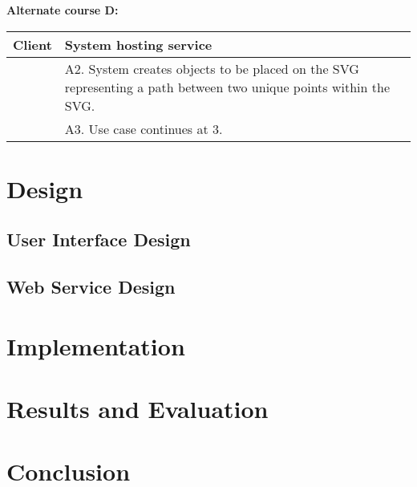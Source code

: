 \documentclass[11pt,twoside,a4paper]{article}
\begin{document}
\noindent
\textbf{Alternate course D:}\\
\begin{tabularx}{\textwidth}{ |X|X| }
  \textbf{Client} & \textbf{System hosting service}\\
  \hline
  & A2. System creates objects to be placed on the SVG representing a
  path between two unique points within the SVG.\\
  \hline
  & A3. Use case continues at 3.\\
  \hline
\end{tabularx}

\section{Design}

\subsection{User Interface Design}
  
\subsection{Web Service Design}

\section{Implementation}

\section{Results and Evaluation}

\section{Conclusion}


\end{document}
